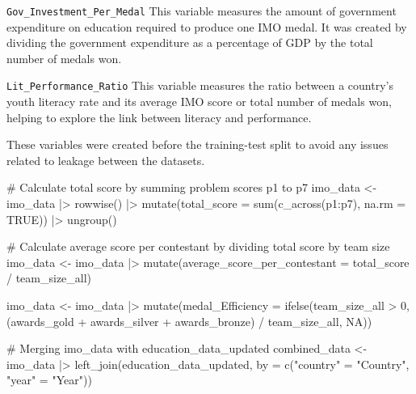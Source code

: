 \documentclass[
  letterpaper,
  DIV=11,
  numbers=noendperiod]{scrartcl}
\newenvironment{Shaded}{\begin{snugshade}}{\end{snugshade}}
\newcommand{\AttributeTok}[1]{\textcolor[rgb]{0.40,0.45,0.13}{#1}}
\newcommand{\CommentTok}[1]{\textcolor[rgb]{0.37,0.37,0.37}{#1}}
\newcommand{\ConstantTok}[1]{\textcolor[rgb]{0.56,0.35,0.01}{#1}}
\newcommand{\DecValTok}[1]{\textcolor[rgb]{0.68,0.00,0.00}{#1}}
\newcommand{\FunctionTok}[1]{\textcolor[rgb]{0.28,0.35,0.67}{#1}}
\newcommand{\NormalTok}[1]{\textcolor[rgb]{0.00,0.23,0.31}{#1}}
\newcommand{\OtherTok}[1]{\textcolor[rgb]{0.00,0.23,0.31}{#1}}
\newcommand{\SpecialCharTok}[1]{\textcolor[rgb]{0.37,0.37,0.37}{#1}}
\newcommand{\StringTok}[1]{\textcolor[rgb]{0.13,0.47,0.30}{#1}}
\begin{document}
\texttt{Gov\_Investment\_Per\_Medal} This variable measures the amount
of government expenditure on education required to produce one IMO
medal. It was created by dividing the government expenditure as a
percentage of GDP by the total number of medals won.

\texttt{Lit\_Performance\_Ratio} This variable measures the ratio
between a country's youth literacy rate and its average IMO score or
total number of medals won, helping to explore the link between literacy
and performance.

These variables were created before the training-test split to avoid any
issues related to leakage between the datasets.

\begin{Shaded}
\begin{Highlighting}[]
\CommentTok{\# Calculate total score by summing problem scores p1 to p7}
\NormalTok{imo\_data }\OtherTok{\textless{}{-}}\NormalTok{ imo\_data }\SpecialCharTok{|\textgreater{}}
  \FunctionTok{rowwise}\NormalTok{() }\SpecialCharTok{|\textgreater{}}
  \FunctionTok{mutate}\NormalTok{(}\AttributeTok{total\_score =} \FunctionTok{sum}\NormalTok{(}\FunctionTok{c\_across}\NormalTok{(p1}\SpecialCharTok{:}\NormalTok{p7), }\AttributeTok{na.rm =} \ConstantTok{TRUE}\NormalTok{)) }\SpecialCharTok{|\textgreater{}}
  \FunctionTok{ungroup}\NormalTok{()  }

\CommentTok{\# Calculate average score per contestant by dividing total score by team size}
\NormalTok{imo\_data }\OtherTok{\textless{}{-}}\NormalTok{ imo\_data }\SpecialCharTok{|\textgreater{}}
  \FunctionTok{mutate}\NormalTok{(}\AttributeTok{average\_score\_per\_contestant =}\NormalTok{ total\_score }\SpecialCharTok{/}\NormalTok{ team\_size\_all)}

\NormalTok{imo\_data }\OtherTok{\textless{}{-}}\NormalTok{ imo\_data }\SpecialCharTok{|\textgreater{}}
  \FunctionTok{mutate}\NormalTok{(}\AttributeTok{medal\_Efficiency =} \FunctionTok{ifelse}\NormalTok{(team\_size\_all }\SpecialCharTok{\textgreater{}} \DecValTok{0}\NormalTok{, }
\NormalTok{                                   (awards\_gold }\SpecialCharTok{+}\NormalTok{ awards\_silver }\SpecialCharTok{+}\NormalTok{ awards\_bronze) }\SpecialCharTok{/}\NormalTok{ team\_size\_all, }
                                   \ConstantTok{NA}\NormalTok{))}

\CommentTok{\# Merging \textquotesingle{}imo\_data\textquotesingle{} with \textquotesingle{}education\_data\_updated\textquotesingle{}}
\NormalTok{combined\_data }\OtherTok{\textless{}{-}}\NormalTok{ imo\_data }\SpecialCharTok{|\textgreater{}}
  \FunctionTok{left\_join}\NormalTok{(education\_data\_updated, }\AttributeTok{by =} \FunctionTok{c}\NormalTok{(}\StringTok{"country"} \OtherTok{=} \StringTok{"Country"}\NormalTok{, }\StringTok{"year"} \OtherTok{=} \StringTok{"Year"}\NormalTok{))}


\end{Highlighting}
\end{Shaded}
\end{document}
